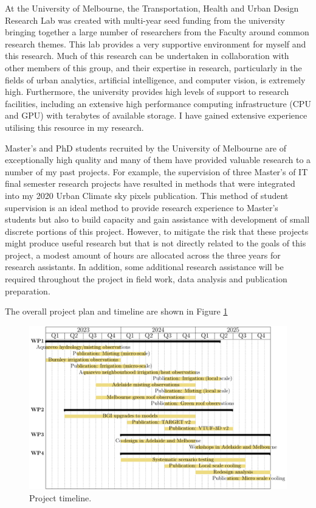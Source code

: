 At the University of Melbourne, the Transportation, Health and Urban Design Research Lab was created with multi-year seed funding from the university bringing together a large number of researchers from the Faculty around common research themes. This lab provides a very supportive environment for myself and this research. Much of this research can be undertaken in collaboration with other members of this group, and their expertise in research, particularly in the fields of urban analytics, artificial intelligence, and computer vision, is extremely high. Furthermore, the university provides high levels of support to research facilities, including an extensive high performance computing infrastructure (CPU and GPU) with terabytes of available storage. I have gained extensive experience utilising this resource in my research. 

Master's and PhD students recruited by the University of Melbourne are of exceptionally high quality and many of them have provided valuable research to a number of my past projects. For example, the supervision of three Master's of IT final semester research projects have resulted in methods that were integrated into my 2020 Urban Climate sky pixels publication\cite{Nice2020}. This method of student supervision is an ideal method to provide research experience to Master's students but also to build capacity and gain assistance with development of small discrete portions of this project. However, to mitigate the risk that these projects might produce useful research but that is not directly related to the goals of this project, a modest amount of hours are allocated across the three years for research assistants. In addition, some additional research assistance will be required throughout the project in field work, data analysis and publication preparation.

The overall project plan and timeline are shown in Figure \ref{fig:timeline}

\begin{figure}[ht]
\centering
\includegraphics[scale=0.70]{DECRA-D-timeline.pdf}
\caption{Project timeline. }
\label{fig:timeline}
\end{figure}


